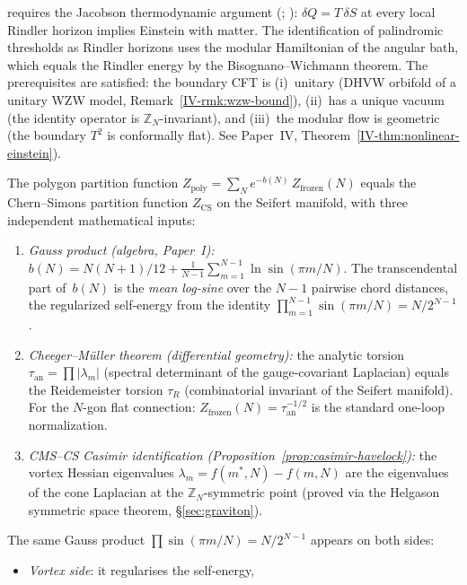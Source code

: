 requires the Jacobson thermodynamic argument
(\citealt{Jacobson1995}; \citealt{Lashkari2014}):
$\delta Q = T\,\delta S$ at every local Rindler horizon
implies Einstein with matter.
The identification of palindromic thresholds as Rindler
horizons uses the modular Hamiltonian of the angular bath,
which equals the Rindler energy by the
Bisognano--Wichmann theorem.
The prerequisites are satisfied: the boundary CFT
is (i)~unitary (DHVW orbifold of a unitary WZW model,
Remark~\ref*{IV-rmk:wzw-bound}),
(ii)~has a unique vacuum (the identity operator is
$\mathbb{Z}_N$-invariant), and
(iii)~the modular flow is geometric (the boundary
$T^2$ is conformally flat).
See Paper~IV,
Theorem~\ref*{IV-thm:nonlinear-einstein}).

\begin{proposition}
\label{prop:partition-verification}
The polygon partition function
$Z_{\mathrm{poly}} = \sum_N e^{-b(N)}\,Z_{\mathrm{frozen}}(N)$
equals the Chern--Simons partition function
$Z_{\mathrm{CS}}$ on the Seifert manifold, with three
independent mathematical inputs:
\begin{enumerate}
\item \emph{Gauss product (algebra, Paper~I):}
  $b(N) = N(N{+}1)/12 + \frac{1}{N{-}1}\sum_{m=1}^{N-1}
  \ln\sin(\pi m/N)$.
  The transcendental part of~$b(N)$ is the
  \emph{mean log-sine} over the $N{-}1$ pairwise chord
  distances, the regularized self-energy from the identity
  $\prod_{m=1}^{N-1}\sin(\pi m/N) = N/2^{N-1}$.
\item \emph{Cheeger--M\"uller theorem (differential geometry):}
  the analytic torsion $\tau_{\mathrm{an}} = \prod|{\lambda_m}|$
  (spectral determinant of the gauge-covariant Laplacian)
  equals the Reidemeister torsion $\tau_R$ (combinatorial
  invariant of the Seifert manifold).
  For the $N$-gon flat connection:
  $Z_{\mathrm{frozen}}(N) = \tau_{\mathrm{an}}^{-1/2}$
  is the standard one-loop normalization.
\item \emph{CMS--CS Casimir identification
  (Proposition~\ref{prop:casimir-havelock}):}
  the vortex Hessian eigenvalues $\lambda_m = f(m^*,N){-}f(m,N)$
  are the eigenvalues of the cone Laplacian at the
  $\mathbb{Z}_N$-symmetric point (proved via the
  Helgason symmetric space theorem, \S\ref{sec:graviton}).
\end{enumerate}
The same Gauss product $\prod\sin(\pi m/N) = N/2^{N-1}$
appears on both sides:
\begin{itemize}
\item \emph{Vortex side}: it regularises the self-energy,

\end{itemize}
\end{proposition}
